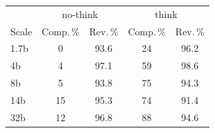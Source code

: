 \begin{tabular}{lcccc}
\toprule
& \multicolumn{2}{c}{no-think} & \multicolumn{2}{c}{think} \\
Scale & Comp.\,\% & Rev.\,\% & Comp.\,\% & Rev.\,\% \\
\midrule
1.7b & 0 & 93.6 & 24 & 96.2 \\
4b & 4 & 97.1 & 59 & 98.6 \\
8b & 5 & 93.8 & 75 & 94.3 \\
14b & 15 & 95.3 & 74 & 91.4 \\
32b & 12 & 96.8 & 88 & 94.6 \\
\bottomrule
\end{tabular}

